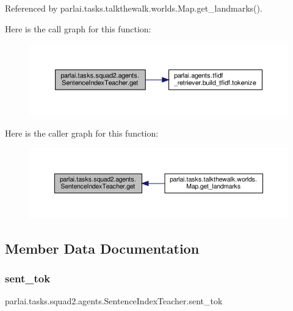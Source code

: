Referenced by parlai.\+tasks.\+talkthewalk.\+worlds.\+Map.\+get\+\_\+landmarks().

Here is the call graph for this function\+:
\nopagebreak
\begin{figure}[H]
\begin{center}
\leavevmode
\includegraphics[width=350pt]{classparlai_1_1tasks_1_1squad2_1_1agents_1_1SentenceIndexTeacher_a61367987adc2bf1f623e66d6f690ad57_cgraph}
\end{center}
\end{figure}
Here is the caller graph for this function\+:
\nopagebreak
\begin{figure}[H]
\begin{center}
\leavevmode
\includegraphics[width=350pt]{classparlai_1_1tasks_1_1squad2_1_1agents_1_1SentenceIndexTeacher_a61367987adc2bf1f623e66d6f690ad57_icgraph}
\end{center}
\end{figure}


\subsection{Member Data Documentation}
\mbox{\label{classparlai_1_1tasks_1_1squad2_1_1agents_1_1SentenceIndexTeacher_ac9b01a4a40b5a1a6de68d24e075a22fb}} 
\subsubsection{\texorpdfstring{sent\+\_\+tok}{sent\_tok}}
{\footnotesize\ttfamily parlai.\+tasks.\+squad2.\+agents.\+Sentence\+Index\+Teacher.\+sent\+\_\+tok}



